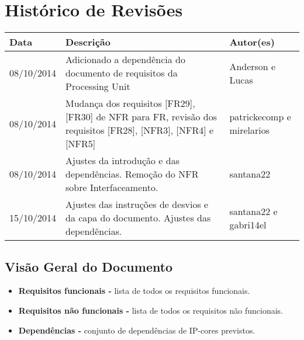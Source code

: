 \documentclass{article}
\begin{document}
\section*{\center Histórico de Revisões}
\vspace*{1cm}
\begin{table}[ht]
	\centering
	\begin{tabular}[pos]{|m{2cm} | m{7.2cm} | m{3.8cm}|} \hline \cellcolor[gray]{0.9}
		
		\textbf{Data} & \cellcolor[gray]{0.9}\textbf{Descrição} & \cellcolor[gray]{0.9} \textbf{Autor(es)}\\ \hline
		
		\small 08/10/2014 & \small Adicionado a dependência do documento de requisitos da Processing Unit & \small Anderson e Lucas \\ \hline 
		
		\small 08/10/2014 & \small Mudança dos requisitos [FR29], [FR30] de NFR para FR, revisão dos requisitos [FR28], [NFR3], [NFR4] e [NFR5] & \small patrickecomp e mirelarios \\ \hline
		
		\small 08/10/2014 & \small Ajustes da introdução e das dependências. Remoção do NFR sobre Interfaceamento. & \small santana22 \\ \hline
		
		\small 15/10/2014 & \small Ajustes das instruções de desvios e da capa do documento. Ajustes das dependências. & \small santana22 e gabri14el \\ \hline
		
	\end{tabular}
\end{table}
		
\tableofcontents
\newpage
		
    
		
	\subsection{Visão Geral do Documento}
		\begin{itemize}
			\item \textbf{Requisitos funcionais -} lista de todos os requisitos funcionais.
			\item \textbf{Requisitos não funcionais -} lista de todos os requisitos não funcionais.
			\item \textbf{Dependências -} conjunto de dependências de IP-cores previstos.
		\end{itemize}
		
\end{document}
